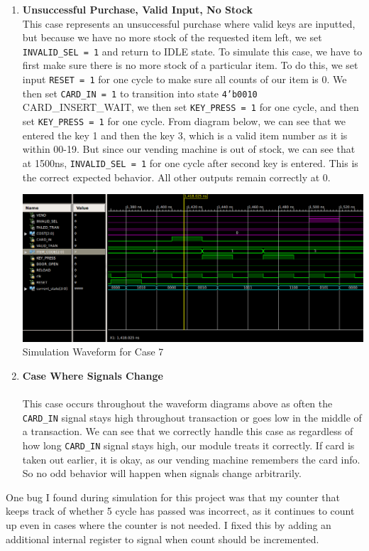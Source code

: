 \documentclass{article}
\begin{document}
\begin{enumerate}
    \item \textbf{Unsuccessful Purchase, Valid Input, No Stock}   \\
    This case represents an unsuccessful purchase where valid keys are inputted, but because we have no more stock of the requested item left, we set \texttt{INVALID\_SEL = 1} and return to IDLE state.  To simulate this case, we have to first make sure there is no more stock of a particular item. To do this, we set input \texttt{RESET = 1} for one cycle to make sure all counts of our item is 0. We then set \texttt{CARD\_IN = 1} to transition into state \texttt{4'b0010} CARD\_INSERT\_WAIT, we then set \texttt{KEY\_PRESS = 1} for one cycle, and then set \texttt{KEY\_PRESS = 1} for one cycle. From diagram below, we can see that we entered the key 1 and then the key 3, which is a valid item number as it is within 00-19. But since our vending machine is out of stock, we can see that at 1500ns, \texttt{INVALID\_SEL = 1} for one cycle after second key is entered. This is the correct expected behavior. All other outputs remain correctly at 0.
    \begin{center}
        \includegraphics[scale=0.4]{waveform-7.png} \\
        \caption{Simulation Waveform for Case 7}
    \end{center}
    \item \textbf{Case Where Signals Change} \\ \\
    This case occurs throughout the waveform diagrams above as often the \texttt{CARD\_IN} signal stays high throughout transaction or goes low in the middle of a transaction. We can see that we correctly handle this case as regardless of how long \texttt{CARD\_IN} signal stays high, our module treats it correctly. If card is taken out earlier, it is okay, as our vending machine remembers the card info. So no odd behavior will happen when signals change arbitrarily.
\end{enumerate}
One bug I found during simulation for this project was that my counter that keeps track of whether 5 cycle has passed was incorrect, as it continues to count up even in cases where the counter is not needed. I fixed this by adding an additional internal register to signal when count should be incremented.
\end{document}
